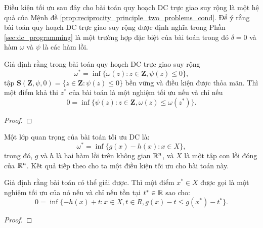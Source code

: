 \documentclass[a4paper]{report}
\begin{document}
    Điều kiện tối ưu sau đây cho bài toán quy hoạch DC trực giao suy rộng là một hệ quả của Mệnh đề \ref{prop:reciprocity_principle_two_problems_cond}. Để ý rằng bài toán quy hoạch DC trực giao suy rộng được định nghĩa trong Phần \ref{sec:dc_programming} là một trường hợp đặc biệt của bài toán  trong đó $\delta = 0$ và hàm $\omega$ và $\psi$ là các hàm lồi.

    \begin{proposition}
        Giả định rằng trong bài toán quy hoạch DC trực giao suy rộng
        \begin{equation}
            \label{eq:generalized_canonical_dc_program}
            \omega^* = \inf\{\omega(z): z \in \mathbf{Z}, \psi(z) \leq 0\},
        \end{equation}
        tập $\mathbf{S}(\mathbf{Z}, \psi, 0) = \{z \in \mathbf{Z}: \psi(z) \leq 0\}$ bền vững và điều kiện  được thỏa mãn. Thì một điểm khả thi $z^*$ của bài toán  là một nghiệm tối ưu nếu và chỉ nếu 
        \begin{equation}
            0 = \inf\{\psi(z): z \in \mathbf{Z}, \omega(z) \leq \omega(z^*)\}.
        \end{equation}
    \end{proposition}
    \begin{proof}
        
    \end{proof}
    
    Một lớp quan trọng của bài toán tối ưu DC là:
    \begin{equation}
        \label{eq:dc_programming_gh_convex}
        \omega^* = \inf\{g(x) - h(x): x \in {X}\},
    \end{equation}
    trong đó, $g$ và $h$ là hai hàm lồi trên không gian $\mathbb{R}^n$, và $X$ là một tập con lồi đóng của $\mathbb{R}^n$. Kết quả tiếp theo cho ta một điều kiện tối ưu cho bài toán này.

    \begin{proposition}
        Giả định rằng bài toán  có thể giải được. Thì một điểm $x^* \in X$ được gọi là một nghiệm tối ưu của nó nếu và chỉ nếu tồn tại $t^* \in \mathbb{R}$ sao cho:
        \begin{equation}
            0 = \inf\{ -h(x)+t: x \in X, t \in R, g(x) - t \leq g(x^*) - t^*\}.
        \end{equation}
    \end{proposition} 
    \begin{proof}
        
    \end{proof}   
\end{document}
